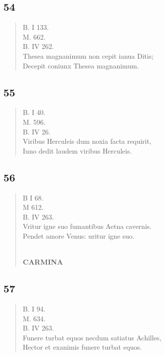 \documentclass[11pt, a4paper]{report}
\begin{document}
            \subsection*{54}
      \begin{verse}
      B. I 133. \\ M. 662. \\ B. IV 262. \\ Thesea magnanimum non cepit ianua Ditis; \\ Decepit coniunx Thesea magnanimum. \\ 
      \end{verse}
  
            \subsection*{55}
      \begin{verse}
      B. I 40. \\ M. 596. \\ B. IV 26. \\ Viribus Herculeis dum noxia facta requirit, \\ Iuno dedit laudem viribus Herculeis. \\ 
      \end{verse}
  
            \subsection*{56}
      \begin{verse}
      B I 68. \\ M 612. \\ B. IV 263. \\ Vritur igne suo fumantibus Aetna cavernis. \\ Pendet amore Venus: uritur igne suo. \\ 
        ﻿\pagebreak 
    \begin{center} \textbf{CARMINA} \end{center} \marginpar{[106]} 
      \end{verse}
  
            \subsection*{57}
      \begin{verse}
      B. I 94. \\ M. 634. \\ B. IV 263. \\ Funere turbat equos necdum satiatus Achilles, \\ Hector et exanimis funere turbat equos. \\ 
      \end{verse}
  
\end{document}
